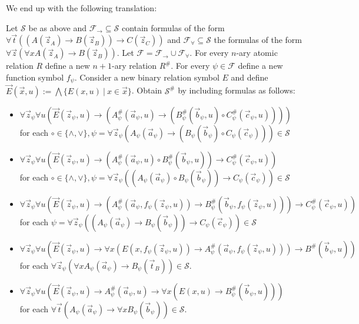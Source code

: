 \documentclass[a4paper,UKenglish,cleveref, autoref, thm-restate]{lipics-v2021}
\begin{document}
We end up with the following translation:

\begin{theorem}
	Let $\mathcal S$ be as above and $\mathcal F_\to\subseteq\mathcal S$ contain formulas of the form $\forall \vec t((A(\vec z_A)\to B(\vec z_B))\to C(\vec z_C))$ and $\mathcal F_\forall\subseteq\mathcal S$ the formulas of the form $\forall \vec z(\forall xA(\vec z_A)\to B(\vec z_B))$. Let $\mathcal F = \mathcal F_\to\cup\mathcal F_\forall$. For every $n$-ary atomic relation $R$ define a new $n+1$-ary relation $R^\#$. For every $\psi\in\mathcal F$ define a new function symbol $f_\psi$. Consider a new binary relation symbol $E$ and define $\vec E(\vec x, u) := \bigwedge\{E(x, u)\:|\:x\in\vec x\}$. Obtain $\mathcal S^\#$ by including formulas as follows:
	\begin{itemize}
		\item $\forall \vec z_\psi\forall u(\vec E(\vec z_\psi, u)\to (A_\psi^\#(\vec a_\psi, u)\to (B_\psi^\#(\vec b_\psi, u)\circ C_\psi^\#(\vec c_\psi, u))))$\\for each $\circ\in\{\wedge, \vee\}, \psi = \forall \vec z_\psi(A_\psi(\vec a_\psi)\to (B_\psi(\vec b_\psi)\circ C_\psi(\vec c_\psi)))\in\mathcal S$
		\item $\forall \vec z_\psi\forall u(\vec E(\vec z_\psi, u)\to (A_\psi^\#(\vec a_\psi, u)\circ B_\psi^\#(\vec b_\psi, u))\to C_\psi^\#(\vec c_\psi, u))$\\for each $\circ\in\{\wedge, \vee\}, \psi = \forall \vec z_\psi((A_\psi(\vec a_\psi)\circ B_\psi(\vec b_\psi))\to C_\psi(\vec c_\psi))\in\mathcal S$
		\item $\forall \vec z_\psi\forall u(\vec E(\vec z_\psi, u)\to(A_\psi^\#(\vec a_\psi, f_\psi(\vec z_\psi, u))\to B_\psi^\#(\vec b_\psi, f_\psi(\vec z_\psi, u)))\to C_\psi^\#(\vec c_\psi, u))$ for each $\psi = \forall \vec z_\psi((A_\psi(\vec a_\psi)\to B_\psi(\vec b_\psi))\to C_\psi(\vec c_\psi))\in\mathcal S$
		\item  $\forall \vec z_\psi\forall u(\vec E(\vec z_\psi, u)\to \forall x(E(x, f_\psi(\vec z_\psi, u))\to A_\psi^\#(\vec a_\psi, f_\psi(\vec z_\psi, u)))\to B^\#(\vec b_\psi, u))$\\for each $\forall \vec z_\psi(\forall xA_\psi(\vec a_\psi)\to B_\psi(\vec t_B))\in\mathcal S$.
		\item $\forall \vec z_\psi\forall u(\vec E(\vec z_\psi, u)\to A^\#_\psi(\vec a_\psi, u)\to \forall x(E(x, u)\to B^\#_\psi(\vec b_\psi, u)))$\\for each $\forall \vec t(A_\psi(\vec a_\psi)\to \forall xB_\psi(\vec b_\psi))\in\mathcal S$.

\end{itemize}
\end{theorem}
\end{document}
